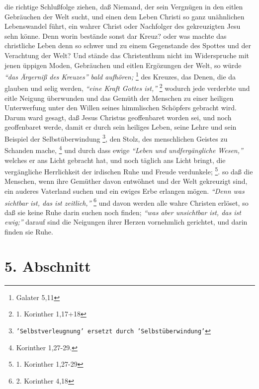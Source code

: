 die richtige Schlußfolge ziehen, daß Niemand, der sein Vergnügen in den eitlen
Gebräuchen der Welt sucht, und einen dem Leben Christi so ganz unähnlichen
Lebenswandel führt, ein wahrer Christ oder Nachfolger des gekreuzigten Jesu sehn
könne. Denn worin bestände sonst dar Kreuz? oder was machte das christliche
Leben denn so schwer und zu einem Gegenstande des Spottes und der Verachtung der
Welt? Und stände das Christenthum nicht im Widerspruche mit jenen üppigen Moden,
Gebräuchen und eitlen Ergözungen der Welt, so würde
\textit{"`das Ärgerniß des Kreuzes"' bald aufhören;}
\footnote{Galater 5,11}
des Kreuzes, das Denen, die da glauben und
selig werden,
\textit{"`eine Kraft Gottes ist,"'}
\footnote{1. Korinther 1,17+18}
wodurch jede
verderbte und eitle Neigung überwunden und das Gemüth der Menschen zu einer
heiligen Unterwerfung unter den Willen seines himmlischen Schöpfers gebracht
wird. Darum ward gesagt, daß Jesus Christus geoffenbaret worden sei, und noch
geoffenbaret werde, damit er durch sein heiliges Leben, seine Lehre und sein
Beispiel der Selbstüberwindung
\footnote{\texttt{'Selbstverleugnung' ersetzt durch 'Selbstüberwindung'}}, den Stolz, des menschlichen Geistes zu Schanden
mache,
\footnote{Korinther 1,27-29.}
und durch dass ewige \textit{"`Leben und undfergängliche
Wesen,"'} welches er ans Licht gebracht hat, und noch täglich ans Licht bringt,
die vergängliche Herrlichkeit der irdischen Ruhe und Freude
verdunkele;
\footnote{1. Korinther 1,27-29}.
so daß die Menschen, wenn ihre
Gemüther davon entwöhnet und der Welt gekreuzigt sind, ein auderes Vaterland
suchen und ein ewiges Erbe erlangen mögen.
\textit{"`Denn was sichtbar ist, das ist zeitlich,"'}
\footnote{2. Korinther 4,18}
und davon werden alle wahre Christen erlöset,
so daß sie keine Ruhe darin suchen noch finden;
\textit{"`was aber unsichtbar ist, das
ist ewig;"'} darauf sind die Neigungen ihrer Herzen vornehmlich gerichtet, und
darin finden sie Ruhe.

\section{5. Abschnitt} \label{kap16_ab5}

